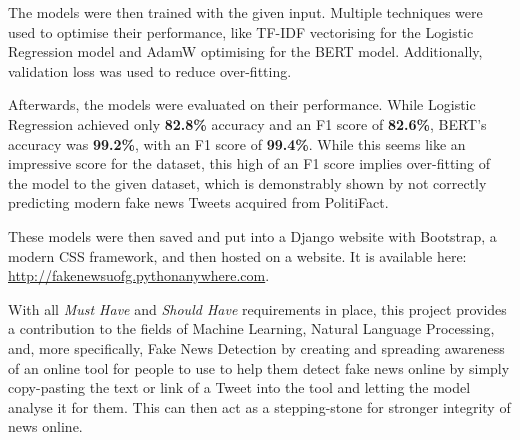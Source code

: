 \documentclass{l4proj}
\begin{document}
The models were then trained with the given input. Multiple techniques were used to optimise their performance, like TF-IDF vectorising for the Logistic Regression model and AdamW optimising for the BERT model. Additionally, validation loss was used to reduce over-fitting.

Afterwards, the models were evaluated on their performance. While Logistic Regression achieved only \textbf{82.8\%} accuracy and an F1 score of \textbf{82.6\%}, BERT's accuracy was \textbf{99.2\%}, with an F1 score of \textbf{99.4\%}. While this seems like an impressive score for the dataset, this high of an F1 score implies over-fitting of the model to the given dataset, which is demonstrably shown by not correctly predicting modern fake news Tweets acquired from PolitiFact.

These models were then saved and put into a Django website with Bootstrap, a modern CSS framework, and then hosted on a website. It is available here: \url{http://fakenewsuofg.pythonanywhere.com}.

With all \textit{Must Have} and \textit{Should Have} requirements in place, this project provides a contribution to the fields of Machine Learning, Natural Language Processing, and, more specifically, Fake News Detection by creating and spreading awareness of an online tool for people to use to help them detect fake news online by simply copy-pasting the text or link of a Tweet into the tool and letting the model analyse it for them. This can then act as a stepping-stone for stronger integrity of news online.

%
% 
\end{document}
